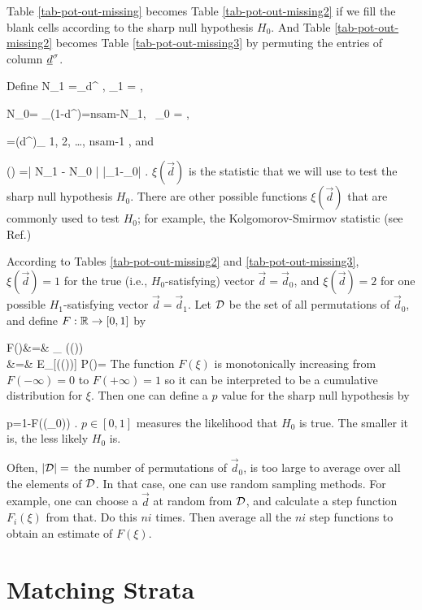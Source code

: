 Table \ref{tab-pot-out-missing} becomes
Table \ref{tab-pot-out-missing2}
if we fill the blank cells
according to the
sharp null hypothesis $H_0$.
And Table \ref{tab-pot-out-missing2}
becomes  Table \ref{tab-pot-out-missing3}
by permuting
the entries of column ${\underline{d}}^\sigma$.

Define
\beq
N_1 =\sum_\s d^\s
,\;\;\; \pi_1 = 
\;,
\eeq

\beq
N_0= \sum_\s (1-d^\s)=nsam-N_1,
\;\;\
\pi_0 = 
\;,
\eeq

 
\beq
{}=(d^\s)_{ 1, 2, \ldots, nsam-1}
\;,
\eeq
and


\beq
\xi() =\left|
{N_1}
-
{N_0}
\right|
\rarrow |\caly_1-\caly_0|
\label{eq-xi-d-def}
\;.
\eeq
$\xi(\vec{d})$
is the statistic
that we will use to 
test the sharp null hypothesis $H_0$.
There are other
possible functions $\xi(\vec{d})$
that are commonly used 
to test $H_0$; for example,
the Kolgomorov-Smirmov statistic 
(see Ref.\cite{book-mixtape})

According
to Tables
\ref{tab-pot-out-missing2}
and
\ref{tab-pot-out-missing3}, 
$\xi(\vec{d})=1$
for the true (i.e., $H_0$-satisfying) 
 vector $\vec{d}=\vec{d}_0$,
and $\xi(\vec{d})=2$ for
one possible
$H_1$-satisfying vector  
$\vec{d}=\vec{d}_1$.
Let ${\cal D}$ be the
set of all permutations of $\vec{d}_0$,
and define $F:{ \mathbb{R}}\rightarrow [0,1]$ by


\beqa
F(\xi)&=&
\sum_{\in \cald}
\indi(\xi(\vec{d})\leq \xi)
\\
&=&
E_{}[\indi(\xi()\leq \xi)]\;\;\;
P(\vec{d})=
\eeqa
The function $F(\xi)$ is monotonically 
increasing
from $F(-\infty)=0$ to $F(+\infty)=1$
so it can be interpreted to be a cumulative
distribution for $\xi$. Then one can
define a $p$ value
for the sharp null
hypothesis by

\beq
p=1-F(\xi(_0))
\;.
\eeq
$p\in[0,1]$ measures the 
likelihood that $H_0$ is true. The smaller it is, 
the less likely $H_0$ is.

Often, $|{\cal D}|=$ 
the number of permutations of $\vec{d}_0$,
is too large to average over all 
the elements of ${\cal D}$. In that
case, one can use random sampling methods.
For example, one can choose a $\vec{d}$
at random
from ${\cal D}$, 
and calculate a step function $F_i(\xi)$
from that. Do this $ni$ times. Then
average all the $ni$ step functions
to obtain an estimate of $F(\xi)$.


\section{Matching Strata}

